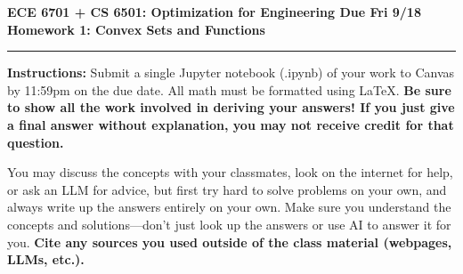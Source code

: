 \documentclass[11pt]{article}
\begin{document}
\thispagestyle{empty}
{\large{\bf ECE 6701 + CS 6501: Optimization for Engineering \hfill Due Fri 9/18}}\\

{\LARGE{\bf Homework 1: Convex Sets and Functions}}
\vspace{0.2\baselineskip}
\hrule

{\bf Instructions:} Submit a single Jupyter notebook (.ipynb) of your work to
Canvas by 11:59pm on the due date. All math must be formatted using LaTeX. {\bf Be sure to show all the work involved in deriving your answers! If you just give
  a final answer without explanation, you may not receive credit for that
  question.}

You may discuss the concepts with your classmates, look on the internet for
help, or ask an LLM for advice, but first try hard to solve problems on your
own, and always write up the answers entirely on your own. Make sure you
understand the concepts and solutions---don't just look up the answers or use AI
to answer it for you. {\bf Cite any sources you used outside of the class
  material (webpages, LLMs, etc.).}
\end{document}
